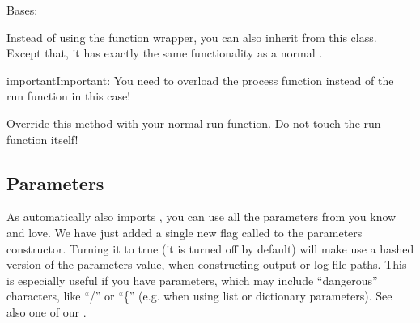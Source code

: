 \documentclass[letterpaper,10pt,english]{sphinxmanual}
\begin{document}

\begin{fulllineitems}
\label{\detokenize{documentation/api:b2luigi.DispatchableTask}}
Bases: 

Instead of using the {\hyperref[\detokenize{documentation/api:b2luigi.dispatch}]{}} function wrapper,
you can also inherit from this class.
Except that, it has exactly the same functionality
as a normal {\hyperref[\detokenize{documentation/api:b2luigi.Task}]{}}.

\begin{sphinxadmonition}{important}{Important:}
You need to overload the process function
instead of the run function in this case!
\end{sphinxadmonition}

\begin{fulllineitems}
\label{\detokenize{documentation/api:b2luigi.DispatchableTask.process}}
Override this method with your normal run function.
Do not touch the run function itself!

\end{fulllineitems}


\end{fulllineitems}



\subsection{Parameters}
\label{\detokenize{documentation/api:parameters}}
As  automatically also imports , you can use all the parameters from 
you know and love.
We have just added a single new flag called  to the parameters constructor.
Turning it to true (it is turned off by default) will make  use a hashed version
of the parameters value, when constructing output or log file paths.
This is especially useful if you have parameters, which may include “dangerous” characters, like “/” or “\{” (e.g.
when using list or dictionary parameters).
See also one of our {\hyperref[\detokenize{advanced/faq:faq-label}]{}}.
\end{document}
